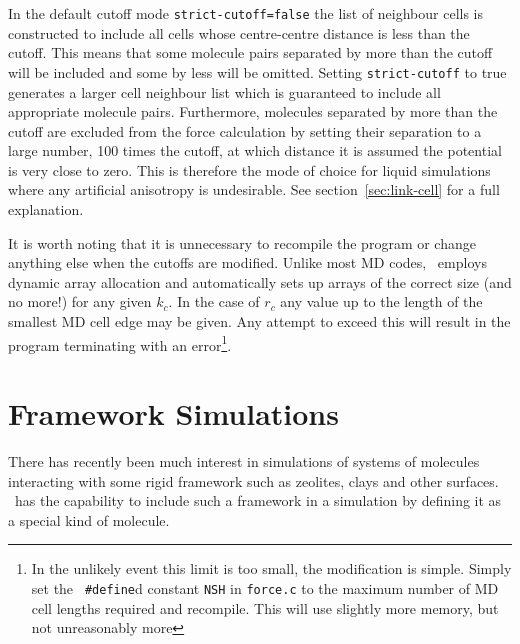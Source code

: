 In the default cutoff mode \verb'strict-cutoff=false' the list of
neighbour cells is constructed to include all cells whose
centre-centre distance is less than the cutoff.  This means that some
molecule pairs separated by more than the cutoff will be included and
some by less will be omitted.  Setting \verb'strict-cutoff' to true
generates a larger cell neighbour list which is guaranteed to include
all appropriate molecule pairs.  Furthermore, molecules separated by
more than the cutoff are excluded from the force calculation by
setting their separation to a large number, 100 times the cutoff, at
which distance it is assumed the potential is very close to zero.
This is therefore the mode of choice for liquid simulations where any
artificial anisotropy is undesirable.  See section~\ref{sec:link-cell}
for a full explanation.

It is worth noting that it is unnecessary to recompile the program or
change anything else when the cutoffs are modified. Unlike most MD
codes, \moldy\  employs dynamic array allocation and automatically sets
up arrays of the correct size (and no more!) for any given $k_{c}$.
In the case of $r_{c}$ any value up to the length of the smallest MD
cell edge may be given. Any attempt to exceed this will result in the
program terminating with an error\footnote{In the unlikely event this
limit is too small, the modification is simple.  Simply set the {\tt
\#define}d constant {\tt NSH} in {\tt force.c} to the maximum number of
MD cell lengths required and recompile.  This will use slightly more
memory, but not unreasonably more}.

\section{Framework Simulations}

There has recently been much interest in simulations of systems of
molecules interacting with some rigid framework such as zeolites,
clays and other surfaces.  \moldy\  has the capability to include such a
framework in a simulation by defining it as a special kind of molecule.

